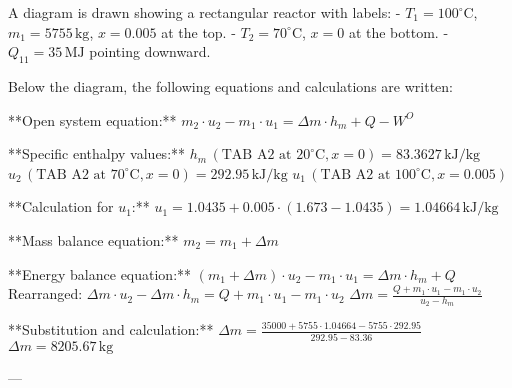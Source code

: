 A diagram is drawn showing a rectangular reactor with labels:  
- \( T_1 = 100^\circ \text{C} \), \( m_1 = 5755 \, \text{kg} \), \( x = 0.005 \) at the top.  
- \( T_2 = 70^\circ \text{C} \), \( x = 0 \) at the bottom.  
- \( Q_{11} = 35 \, \text{MJ} \) pointing downward.  

Below the diagram, the following equations and calculations are written:  

**Open system equation:**  
\( m_2 \cdot u_2 - m_1 \cdot u_1 = \Delta m \cdot h_m + Q - W^O \)  

**Specific enthalpy values:**  
\( h_m \, (\text{TAB A2 at } 20^\circ \text{C}, x = 0) = 83.3627 \, \text{kJ/kg} \)  
\( u_2 \, (\text{TAB A2 at } 70^\circ \text{C}, x = 0) = 292.95 \, \text{kJ/kg} \)  
\( u_1 \, (\text{TAB A2 at } 100^\circ \text{C}, x = 0.005) \)  

**Calculation for \( u_1 \):**  
\( u_1 = 1.0435 + 0.005 \cdot (1.673 - 1.0435) = 1.04664 \, \text{kJ/kg} \)  

**Mass balance equation:**  
\( m_2 = m_1 + \Delta m \)  

**Energy balance equation:**  
\( (m_1 + \Delta m) \cdot u_2 - m_1 \cdot u_1 = \Delta m \cdot h_m + Q \)  
Rearranged:  
\( \Delta m \cdot u_2 - \Delta m \cdot h_m = Q + m_1 \cdot u_1 - m_1 \cdot u_2 \)  
\( \Delta m = \frac{Q + m_1 \cdot u_1 - m_1 \cdot u_2}{u_2 - h_m} \)  

**Substitution and calculation:**  
\( \Delta m = \frac{35000 + 5755 \cdot 1.04664 - 5755 \cdot 292.95}{292.95 - 83.36} \)  
\( \Delta m = 8205.67 \, \text{kg} \)  

---